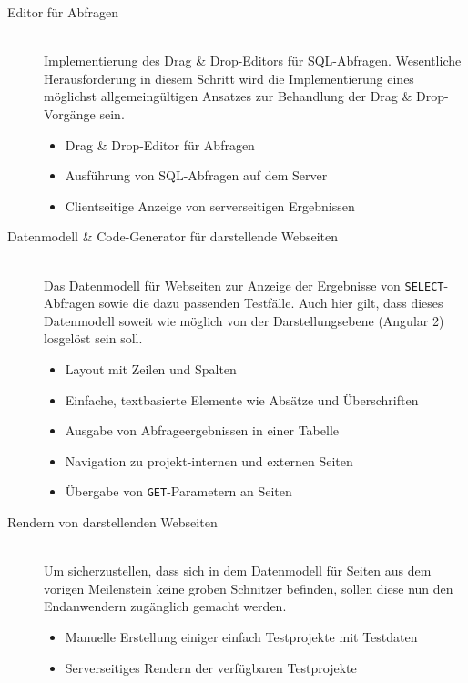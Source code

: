 \begin{description}
\item [Editor für Abfragen] \hfill \\
  Implementierung des Drag \& Drop-Editors für SQL-Abfragen. Wesentliche Herausforderung in diesem Schritt wird die Implementierung eines möglichst allgemeingültigen Ansatzes zur Behandlung der Drag \& Drop-Vorgänge sein.
  \begin{itemize}[noitemsep]
  \item Drag \& Drop-Editor für Abfragen
  \item Ausführung von SQL-Abfragen auf dem Server
  \item Clientseitige Anzeige von serverseitigen Ergebnissen
  \end{itemize}
  
\item [Datenmodell \& Code-Generator für darstellende Webseiten] \hfill \\
  Das Datenmodell für Webseiten zur Anzeige der Ergebnisse von \texttt{SELECT}-Abfragen sowie die dazu passenden Testfälle. Auch hier gilt, dass dieses Datenmodell soweit wie möglich von der Darstellungsebene (Angular 2) losgelöst sein soll.
  \begin{itemize}[noitemsep]
  \item Layout mit Zeilen und Spalten
  \item Einfache, textbasierte Elemente wie Absätze und Überschriften
  \item Ausgabe von Abfrageergebnissen in einer Tabelle
  \item Navigation zu projekt-internen und externen Seiten
  \item Übergabe von \texttt{GET}-Parametern an Seiten
  \end{itemize}
  
\item [Rendern von darstellenden Webseiten] \hfill \\
  Um sicherzustellen, dass sich in dem Datenmodell für Seiten aus dem vorigen Meilenstein keine groben Schnitzer befinden, sollen diese nun den Endanwendern zugänglich gemacht werden.
  \begin{itemize}[noitemsep]
  \item Manuelle Erstellung einiger einfach Testprojekte mit Testdaten
  \item Serverseitiges Rendern der verfügbaren Testprojekte
  \end{itemize}
  

\end{description}
